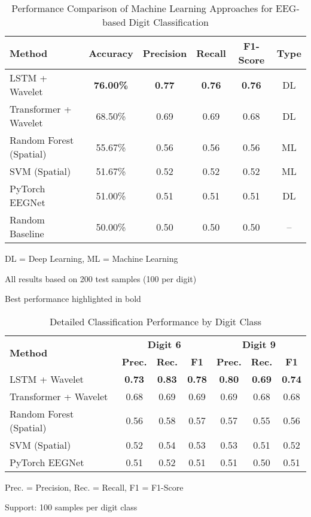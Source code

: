 
\begin{table}[htbp]
\centering
\caption{Performance Comparison of Machine Learning Approaches for EEG-based Digit Classification}
\label{tab:main_results}
\begin{tabular}{|l|c|c|c|c|c|}
\hline
\textbf{Method} & \textbf{Accuracy} & \textbf{Precision} & \textbf{Recall} & \textbf{F1-Score} & \textbf{Type} \\
\hline
LSTM + Wavelet & \textbf{76.00\%} & \textbf{0.77} & \textbf{0.76} & \textbf{0.76} & DL \\
Transformer + Wavelet & 68.50\% & 0.69 & 0.69 & 0.68 & DL \\
Random Forest (Spatial) & 55.67\% & 0.56 & 0.56 & 0.56 & ML \\
SVM (Spatial) & 51.67\% & 0.52 & 0.52 & 0.52 & ML \\
PyTorch EEGNet & 51.00\% & 0.51 & 0.51 & 0.51 & DL \\
\hline
Random Baseline & 50.00\% & 0.50 & 0.50 & 0.50 & -- \\
\hline
\end{tabular}
\begin{tablenotes}
\small
\item DL = Deep Learning, ML = Machine Learning
\item All results based on 200 test samples (100 per digit)
\item Best performance highlighted in bold
\end{tablenotes}
\end{table}

\begin{table}[htbp]
\centering
\caption{Detailed Classification Performance by Digit Class}
\label{tab:detailed_performance}
\begin{tabular}{|l|c|c|c|c|c|c|}
\hline
\multirow{2}{*}{\textbf{Method}} & \multicolumn{3}{c|}{\textbf{Digit 6}} & \multicolumn{3}{c|}{\textbf{Digit 9}} \\
\cline{2-7}
 & \textbf{Prec.} & \textbf{Rec.} & \textbf{F1} & \textbf{Prec.} & \textbf{Rec.} & \textbf{F1} \\
\hline
LSTM + Wavelet & \textbf{0.73} & \textbf{0.83} & \textbf{0.78} & \textbf{0.80} & \textbf{0.69} & \textbf{0.74} \\
Transformer + Wavelet & 0.68 & 0.69 & 0.69 & 0.69 & 0.68 & 0.68 \\
Random Forest (Spatial) & 0.56 & 0.58 & 0.57 & 0.57 & 0.55 & 0.56 \\
SVM (Spatial) & 0.52 & 0.54 & 0.53 & 0.53 & 0.51 & 0.52 \\
PyTorch EEGNet & 0.51 & 0.52 & 0.51 & 0.51 & 0.50 & 0.51 \\
\hline
\end{tabular}
\begin{tablenotes}
\small
\item Prec. = Precision, Rec. = Recall, F1 = F1-Score
\item Support: 100 samples per digit class
\end{tablenotes}
\end{table}

